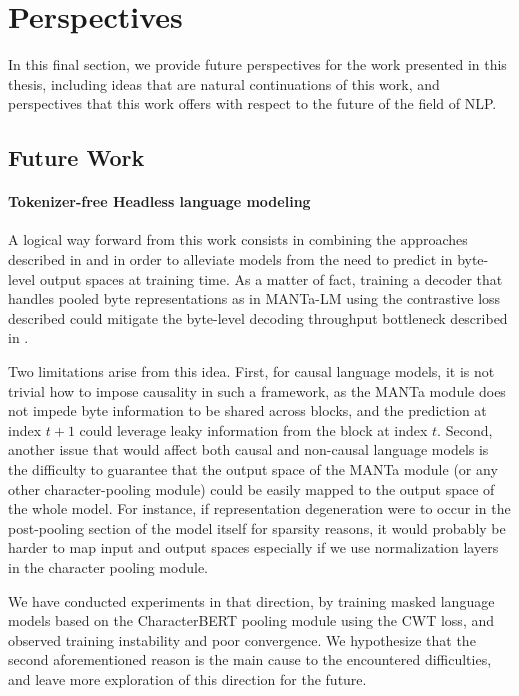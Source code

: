 \section{Perspectives}

In this final section, we provide future perspectives for the work presented in this thesis, including ideas that are natural continuations of this work, and perspectives that this work offers with respect to the future of the field of NLP.

\subsection{Future Work}

\paragraph{Tokenizer-free Headless language modeling} A logical way forward from this work consists in combining the approaches described in  and  in order to alleviate models from the need to predict in byte-level output spaces at training time. As a matter of fact, training a decoder that handles pooled byte representations as in MANTa-LM using the contrastive loss described could mitigate the byte-level decoding throughput bottleneck described in .

Two limitations arise from this idea. First, for causal language models, it is not trivial how to impose causality in such a framework, as the MANTa module does not impede byte information to be shared across blocks, and the prediction at index $t+1$ could leverage leaky information from the block at index $t$. Second, another issue that would affect both causal and non-causal language models is the difficulty to guarantee that the output space of the MANTa module (or any other character-pooling module) could be easily mapped to the output space of the whole model. For instance, if representation degeneration were to occur in the post-pooling section of the model itself for sparsity reasons, it would probably be harder to map input and output spaces especially if we use normalization layers in the character pooling module.

We have conducted experiments in that direction, by training masked language models based on the CharacterBERT pooling module \citep{el-boukkouri-etal-2020-characterbert} using the CWT loss, and observed training instability and poor convergence. We hypothesize that the second aforementioned reason is the main cause to the encountered difficulties, and leave more exploration of this direction for the future.

